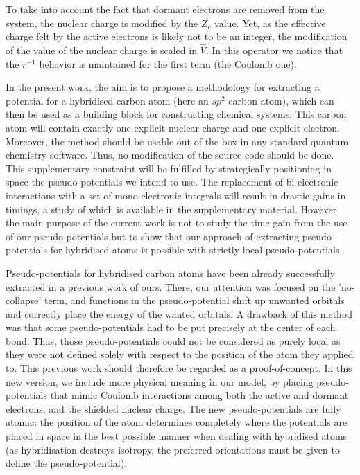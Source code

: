 \documentclass[aip]{revtex4-1}
\begin{document}
To take into account the fact that dormant electrons are removed from the
system, the nuclear charge is modified by the $Z_c$ value.
Yet, as the effective charge felt by the active electrons is likely not to be an integer,
the modification of the value of the nuclear charge is scaled in $\hat{V}$.
In this operator we notice that the \(r^{-1}\) behavior is maintained for the first term 
(the Coulomb one).

In the present work, the aim is 
to propose a methodology for extracting a potential for
a hybridised carbon atom (here an $sp^2$ carbon atom), which can then be
used as a building block for constructing chemical systems. This carbon atom
will contain exactly one explicit nuclear charge and one explicit electron.
Moreover, the method should be usable 
out of the box in any standard quantum chemistry software.
Thus, no modification of the source code should be done.
This supplementary constraint will be fulfilled by strategically positioning in space the pseudo-potentials
we intend to use. 
The replacement of bi-electronic interactions with a set of mono-electronic integrals
will result in drastic gains in timings, a study of which is available in the supplementary material.
However, the main purpose of the current work is not to study the time gain from the use of our pseudo-potentials but to show that our approach of extracting pseudo-potentials
for hybridised atoms is possible with strictly local pseudo-potentials.

Pseudo-potentials for hybridised carbon
atoms have been already successfully extracted in a previous work of ours.\cite{drujon_pseudopotentials_2013}
There, our attention was focused on the 'no-collapse' term, and 
functions in the pseudo-potential shift up unwanted orbitals and correctly place the energy of the
wanted orbitals.
A drawback of this method was that some pseudo-potentials had to be put precisely at the center
of each bond.
Thus, those pseudo-potentials could not be considered as purely local as they were not defined solely
with respect to the position of the atom they applied to.
This previous work should therefore be regarded as a proof-of-concept.
In this new version, we include more physical meaning in our model, 
by placing pseudo-potentials that mimic Coulomb interactions among both the active and dormant electrons, and the shielded nuclear charge. 
The new pseudo-potentials are fully atomic: the position of the atom
determines completely where the potentials are placed in space in the best possible manner
when dealing with hybridised atoms (as hybridisation destroys isotropy, the preferred orientations
must be given to define the pseudo-potential).
\end{document}
